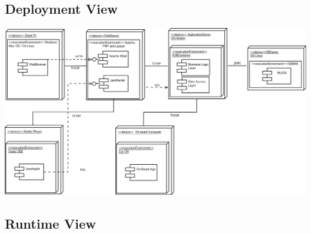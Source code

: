 \documentclass{article}
\begin{document}
\begin{flushleft}
\begin {itemize}
\end{itemize}


\subsection{Deployment View}  %
\vspace{4cm}

\includegraphics[scale=0.3]{deployment} 





\subsection{Runtime View} %


\end{flushleft}
\end{document}
